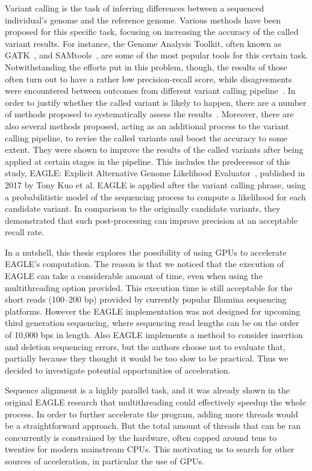 \documentclass{PHlab-thesis}
\begin{document}
Variant calling is the task of inferring differences between a sequenced individual's genome and the reference genome.
Various methods have been proposed for this specific task, focusing on increasing the accuracy of the called variant results. For instance, the Genome Analysis Toolkit, often known as GATK~\cite{mckenna2010genome}, and SAMtools~\cite{li2009sequence}, are some of the most popular tools for this certain task. Notwithstanding the efforts put in this problem, though, the results of those often turn out to have a rather low precision-recall score, while disagreements were encountered between outcomes from different variant calling pipeline~\cite{o2013low}. In order to justify whether the called variant is likely to happen, there are a number of methods proposed to systematically assess the results~\cite{hwang2015systematic,yu2013comparing}. Moreover, there are also several methods proposed, acting as an additional process to the variant calling pipeline, to revise the called variants and boost the accuracy to some extent. They were shown to improve the results of the called variants after being applied at certain stages in the pipeline. This includes the predecessor of this study, EAGLE: Explicit Alternative Genome Likelihood Evaluator~\cite{kuo2018eagle}, published in 2017 by Tony Kuo et al.  EAGLE is applied after the variant calling phrase, using a probabilitistic model of the sequencing process to compute a likelihood for each candidate variant.  In comparison to the originally candidate variants, they demonstrated that such post-processing can improve precision at an acceptable recall rate.

In a nutshell, this thesis explores the possibility of using GPUs to accelerate EAGLE's computation.
The reason is that we noticed that the execution of EAGLE can take a considerable amount of time, even when using the multithreading option provided.  This execution time is still acceptable for the short reads (100--200 bp) provided by currently popular Illumina sequencing platforms.  However the EAGLE implementation was not
designed for upcoming third generation sequencing, where sequencing read lengths can be on the order of 10,000 bps in length.  Also EAGLE implements a method to consider insertion and deletion sequencing errors, but the authors
choose not to evaluate that, partially because they thought it would be too slow to be practical.
Thus we decided to investigate potential opportunities of acceleration.

Sequence alignment is a highly parallel task, and it was already shown in the original EAGLE research that multithreading could effectively speedup the whole process.  In order to further accelerate the program, adding more threads would be a straightforward approach.  But the total amount of threads that can be ran concurrently is constrained by the hardware, often capped around tens to twenties for modern mainstream CPUs.  This motivating us to search for other sources of acceleration, in particular the use of GPUs.
\end{document}
